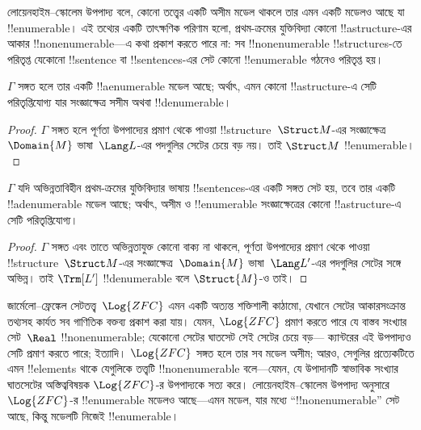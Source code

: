 \documentclass[../../../include/open-logic-section]{subfiles}
\begin{document}

লোয়েনহাইম--স্কোলেম উপপাদ্য বলে, কোনো তত্ত্বের একটি অসীম মডেল থাকলে তার
এমন একটি মডেলও আছে যা !!{enumerable}। এই তথ্যের একটি তাৎক্ষণিক
পরিণাম হলো, প্রথম-ক্রমের যুক্তিবিদ্যা কোনো !!a{structure}-এর আকার
!!{nonenumerable}—এ কথা প্রকাশ করতে পারে না: সব !!{nonenumerable}
!!{structure}s-তে পরিতৃপ্ত যেকোনো !!{sentence} বা !!{sentence}s-এর সেট
কোনো !!{enumerable} গঠনেও পরিতৃপ্ত হয়।

\begin{thm}
 $\Gamma$ সঙ্গত হলে তার একটি !!a{enumerable}
মডেল আছে; অর্থাৎ, এমন কোনো !!a{structure}-এ সেটি পরিতৃপ্তিযোগ্য যার
সংজ্ঞাক্ষেত্র সসীম অথবা !!{denumerable}।
\end{thm}

\begin{proof}
$\Gamma$ সঙ্গত হলে পূর্ণতা উপপাদ্যের প্রমাণ থেকে পাওয়া
!!{structure}~$\Struct M$-এর সংজ্ঞাক্ষেত্র~$\Domain{M}$ ভাষা~$\Lang L$-এর
পদগুলির সেটের চেয়ে বড় নয়। তাই $\Struct M$ !!{enumerable}।
\end{proof}

\begin{thm}
 $\Gamma$ যদি অভিন্নতাবিহীন প্রথম-ক্রমের
যুক্তিবিদ্যার ভাষায় !!{sentence}s-এর একটি সঙ্গত সেট হয়, তবে তার একটি
!!a{denumerable} মডেল আছে; অর্থাৎ, অসীম ও !!{enumerable} সংজ্ঞাক্ষেত্রের
কোনো !!a{structure}-এ সেটি পরিতৃপ্তিযোগ্য।
\end{thm}

\begin{proof}
$\Gamma$ সঙ্গত এবং তাতে অভিন্নতাযুক্ত কোনো বাক্য না থাকলে, পূর্ণতা
উপপাদ্যের প্রমাণ থেকে পাওয়া !!{structure}~$\Struct M$-এর
সংজ্ঞাক্ষেত্র~$\Domain{M}$ ভাষা~$\Lang L'$-এর পদগুলির সেটের সঙ্গে
অভিন্ন। তাই $\Trm[L']$ !!{denumerable} বলে $\Struct{M}$-ও তাই।
\end{proof}

\begin{ex}[স্কোলেমের কূটাভাস]
জার্মেলো--ফ্রেঙ্কেল সেটতত্ত্ব~$\Log{ZFC}$ এমন একটি অত্যন্ত শক্তিশালী
কাঠামো, যেখানে সেটের আকারসংক্রান্ত তথ্যসহ কার্যত সব গাণিতিক বক্তব্য
প্রকাশ করা যায়। যেমন, $\Log{ZFC}$ প্রমাণ করতে পারে যে বাস্তব সংখ্যার
সেট~$\Real$ !!{nonenumerable}; যেকোনো সেটের ঘাতসেট সেই সেটের চেয়ে বড়—
ক্যান্টরের এই উপপাদ্যও সেটি প্রমাণ করতে পারে; ইত্যাদি। $\Log{ZFC}$ সঙ্গত
হলে তার সব মডেল অসীম; আরও, সেগুলির প্রত্যেকটিতে এমন !!{element}s থাকে
যেগুলিকে তত্ত্বটি !!{nonenumerable} বলে—যেমন, যে উপাদানটি স্বাভাবিক
সংখ্যার ঘাতসেটের অস্তিত্ববিষয়ক $\Log{ZFC}$-র উপপাদ্যকে সত্য করে।
লোয়েনহাইম--স্কোলেম উপপাদ্য অনুসারে $\Log{ZFC}$-র !!{enumerable}
মডেলও আছে—এমন মডেল, যার মধ্যে “!!{nonenumerable}” সেট আছে, কিন্তু মডেলটি
নিজেই !!{enumerable}।
\end{ex}
\end{document}
